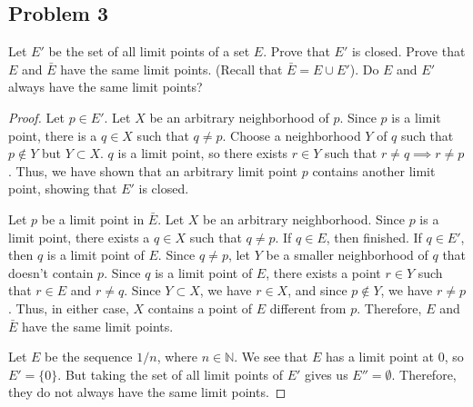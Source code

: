 \documentclass{amsart}
\begin{document}
\subsection*{Problem 3} Let $E'$ be the set of all limit points of a set $E.$ Prove that $E'$ is closed. Prove that $E$ and $\bar{E}$ have the same limit points. (Recall that $\bar{E}=E \cup E'$). Do $E$ and $E'$ always have the same limit points? 
\begin{proof}
    Let $p \in E'$. Let $X$ be an arbitrary neighborhood of $p$. Since $p$ is a limit point, there is a $q \in X$ such that $q \neq p$. Choose a neighborhood $Y$ of $q$ such that $p \not \in Y$ but $Y \subset X$. $q$ is a limit point, so there exists $r \in Y$ such that $r \neq q \implies r \neq p$. Thus, we have shown that an arbitrary limit point $p$ contains another limit point, showing that $E'$ is closed.  

    Let $p$ be a limit point in $\bar{E}$. Let $X$ be an arbitrary neighborhood. Since $p$ is a limit point, there exists a $q \in X$ such that $q \neq p$. If $q \in E$, then finished. If $q \in E'$, then $q$ is a limit point of $E$. Since $q \neq p$, let $Y$ be a smaller neighborhood of $q$ that doesn't contain $p$. Since $q$ is a limit point of $E$, there exists a point $r \in Y$ such that $r \in E$ and $r \neq q$. Since $Y \subset X$, we have $r \in X$, and since $p \notin Y$, we have $r \neq p$. Thus, in either case, $X$ contains a point of $E$ different from $p$. Therefore, $E$ and $\bar{E}$ have the same limit points.

  Let $E$ be the sequence $1/n$, where $n \in \mathbb{N}$. We see that $E$ has a limit point at 0, so $E' = \{0\}$. But taking the set of all limit points of $E'$ gives us $E'' = \emptyset$. Therefore, they do not always have the same limit points.   

    
\end{proof}
\end{document}
